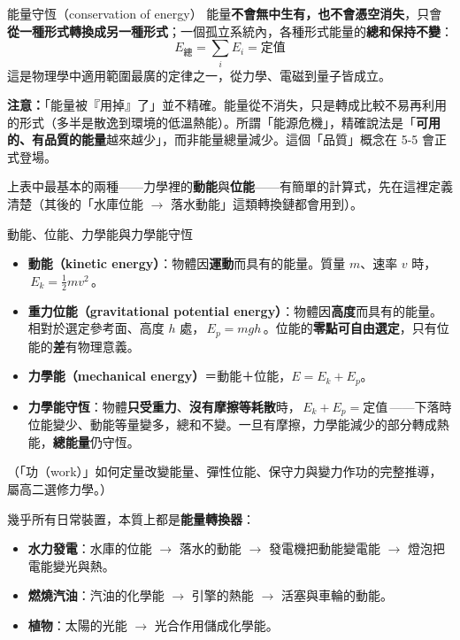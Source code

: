 \documentclass[11pt]{article}
\begin{document}
\begin{補充框}{能量守恆（conservation of energy）}
能量\textbf{不會無中生有，也不會憑空消失}，只會\textbf{從一種形式轉換成另一種形式}；一個孤立系統內，各種形式能量的\textbf{總和保持不變}：
$$\boxed{\;E_{\text{總}} = \sum_i E_i = \text{定值}\;}$$
這是物理學中適用範圍最廣的定律之一，從力學、電磁到量子皆成立。

\textbf{注意：}「能量被『用掉』了」並不精確。能量從不消失，只是轉成比較不易再利用的形式（多半是散逸到環境的低溫熱能）。所謂「能源危機」，精確說法是「\textbf{可用的、有品質的能量}越來越少」，而非能量總量減少。這個「品質」概念在 5-5 會正式登場。
\end{補充框}

上表中最基本的兩種——力學裡的\textbf{動能}與\textbf{位能}——有簡單的計算式，先在這裡定義清楚（其後的「水庫位能 $\rightarrow$ 落水動能」這類轉換鏈都會用到）。

\begin{補充框}{動能、位能、力學能與力學能守恆}
\begin{itemize}\setlength{\itemsep}{2pt}
\item \textbf{動能（kinetic energy）}：物體因\textbf{運動}而具有的能量。質量 $m$、速率 $v$ 時，$\boxed{\,E_k=\tfrac12 mv^2\,}$。
\item \textbf{重力位能（gravitational potential energy）}：物體因\textbf{高度}而具有的能量。相對於選定參考面、高度 $h$ 處，$\boxed{\,E_p=mgh\,}$。位能的\textbf{零點可自由選定}，只有位能的\textbf{差}有物理意義。
\item \textbf{力學能（mechanical energy）}＝動能＋位能，$E=E_k+E_p$。
\item \textbf{力學能守恆}：物體\textbf{只受重力}、\textbf{沒有摩擦等耗散}時，$\boxed{\,E_k+E_p=\text{定值}\,}$——下落時位能變少、動能等量變多，總和不變。一旦有摩擦，力學能減少的部分轉成熱能，\textbf{總能量}仍守恆。
\end{itemize}
（「功（work）」如何定量改變能量、彈性位能、保守力與變力作功的完整推導，屬高二選修力學。）
\end{補充框}


幾乎所有日常裝置，本質上都是\textbf{能量轉換器}：

\begin{itemize}\setlength{\itemsep}{1pt}
\item \textbf{水力發電}：水庫的位能 $\rightarrow$ 落水的動能 $\rightarrow$ 發電機把動能變電能 $\rightarrow$ 燈泡把電能變光與熱。
\item \textbf{燃燒汽油}：汽油的化學能 $\rightarrow$ 引擎的熱能 $\rightarrow$ 活塞與車輪的動能。
\item \textbf{植物}：太陽的光能 $\rightarrow$ 光合作用儲成化學能。
\end{itemize}
\end{document}

